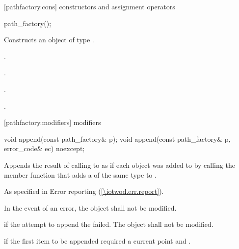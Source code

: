  [pathfactory.cons] { constructors and 
assignment operators}

\begin{itemdecl}
    path_factory();
\end{itemdecl}
\begin{itemdescr}
	\pnum
	\effects
	Constructs an object of type .
	
	\pnum
	\postconditions
	.
	
	\pnum
	.
	
	\pnum
	.
	
	\pnum
	.
\end{itemdescr}

 [pathfactory.modifiers] { modifiers}

\begin{itemdecl}
    void append(const path_factory& p);
    void append(const path_factory& p, error_code& ec) noexcept;
\end{itemdecl}
\begin{itemdescr}
\pnum
\effects
Appends the result of calling  to  as if each  object was added to  by calling the member function that adds a  of the same type to .

\pnum
\throws
As specified in Error reporting (\ref{\iotwod.err.report}).

\pnum
\remarks
In the event of an error, the object shall not be modified.

\pnum
\errors
{} if the attempt to append the  failed. The object shall not be modified.

\pnum
{} if the first item to be appended required a current point and .
\end{itemdescr}

